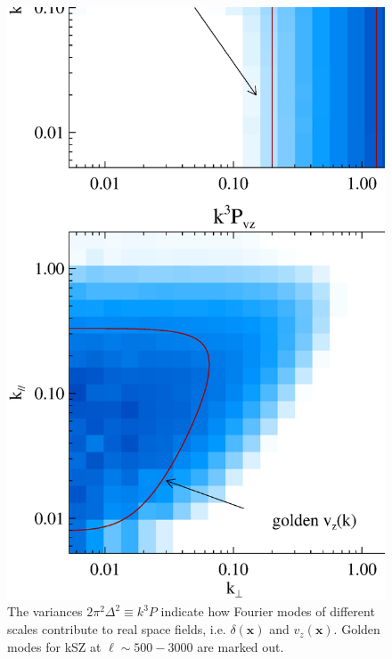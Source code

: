 \begin{figure}[btp]
\captionsetup{width=0.28\linewidth,justification=raggedright}
\begin{minipage}[t]{0.33\linewidth}
\begin{center}
\includegraphics[width=\textwidth,height=1.7\textwidth]{figure/k3pd_k3pv_z1_note.eps}
\end{center}
\vspace{-0.7cm}
\caption{
The variances $2\pi^2\Delta^2\equiv k^3P$ indicate how Fourier modes of different scales contribute to real space fields, i.e. $\delta(\bm{x})$ and $v_z(\bm{x})$. Golden modes  for kSZ at $\ell\sim 500-3000$ are marked out.
}
\end{minipage}
\end{figure}
